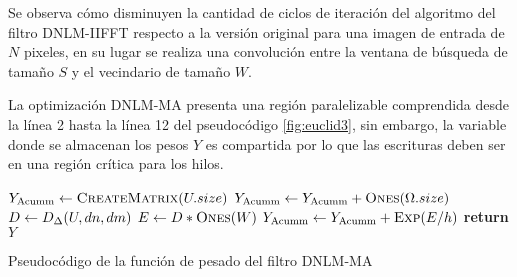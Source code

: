 Se observa c\'omo disminuyen la cantidad de ciclos de iteración del algoritmo del filtro DNLM-IIFFT respecto a la versión original para una imagen de entrada  de $N$ pixeles, en su lugar se realiza una convolución entre la ventana de búsqueda \mat{\Omega} de tama\~no $S$ y el vecindario de tama\~no $W$. 

La optimización DNLM-MA presenta una región paralelizable comprendida desde la línea 2 hasta la línea 12 del pseudoc\'odigo \ref{fig:euclid3}, sin embargo, la variable donde se almacenan los pesos $Y$ es compartida por lo que las escrituras deben ser en una región crítica para los hilos. 


\begin{algorithm}[htbp]
\begin{algorithmic}[1]
\State $Y_{\text{Acumm}}\gets \Call{CreateMatrix}{U.size}$
			\State $Y_{\text{Acumm}}\gets Y_{\text{Acumm}} + \Call{Ones}{\Omega.size}$
		\Else
			\State $D\gets \Call{$D_{\Delta}$}{U,dn,dm}$  
			\State $E\gets D * \Call{Ones}{W}$ 
			\State $Y_{\text{Acumm}}\gets Y_{\text{Acumm}} + \Call{Exp}{E/h}$ 
		\EndIf
	\EndFor
\EndFor
\State \textbf{return} $Y$
\end{algorithmic}
\caption{Pseudocódigo de la funci\'on de pesado del filtro DNLM-MA\label{fig:euclid3}}
\end{algorithm}


 

